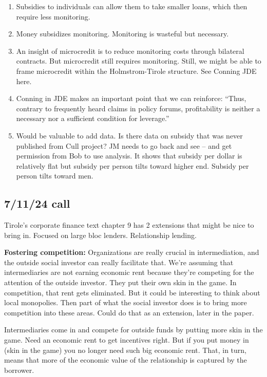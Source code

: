 \documentclass[letterpaper, 12pt]{article}
\begin{document}
\begin{enumerate}
\item Subsidies to individuals can allow them to take smaller loans, which then require less monitoring.
\item Money subsidizes monitoring. Monitoring is wasteful but necessary.
\item An insight of microcredit is to reduce monitoring costs through bilateral contracts. But microcredit still requires monitoring. Still, we might be able to frame microcredit within the Holmstrom-Tirole structure. See Conning JDE here.
\item Conning in JDE makes an important point that we can reinforce: ``Thus, contrary to frequently
heard claims in policy forums, profitability is neither a necessary nor a sufficient
condition for leverage.''
\item Would be valuable to add data. Is there data on subsidy that was never published from Cull project? JM needs to go back and see -- and get permission from Bob to use analysis. It shows that subsidy per dollar is relatively flat but subsidy per person tilts toward higher end. Subsidy per person tilts toward men.
\end{enumerate}

\subsection{7/11/24 call}

Tirole's corporate finance text chapter 9 has 2 extensions that might be nice to bring in. Focused on large bloc lenders. Relationship lending. 

\textbf{Fostering competition:} Organizations are really crucial in intermediation, and the outside social investor can really facilitate that. We're assuming that intermediaries are not earning economic rent because they're competing for the attention of the outside investor. They put their own skin in the game. In competition, that rent gets eliminated. But it could be interesting to think about local monopolies. Then part of what the social investor does is to bring more competition into these areas. Could do that as an extension, later in the paper. 

Intermediaries come in and compete for outside funds by putting more skin in the game. Need an economic rent to get incentives right. But if you put money in (skin in the game) you no longer need such big economic rent. That, in turn, means that more of the economic value of the relationship is captured by the borrower.
\end{document}
